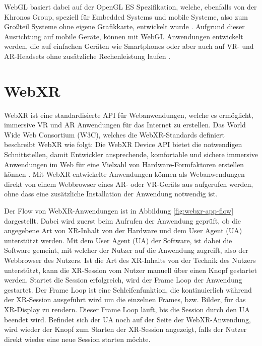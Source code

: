 WebGL basiert dabei auf der OpenGL ES Spezifikation, welche, ebenfalls von der Khronos Group, speziell für Embedded Systems und mobile Systeme, also zum Großteil Systeme ohne eigene Grafikkarte, entwickelt wurde \autocite[]{khronos-opengles}.
Aufgrund dieser Ausrichtung auf mobile Geräte, können mit WebGL Anwendungen entwickelt werden, die auf einfachen Geräten wie Smartphones oder aber auch auf VR- und AR-Headsets ohne zusätzliche Rechenleistung laufen \autocite[][S.3]{Baruah2021}.


\section{WebXR}
\label{section:webxr}

WebXR ist eine standardisierte API für Webanwendungen, welche es ermöglicht, immersive VR und AR Anwendungen für das Internet zu erstellen.
Das World Wide Web Consortium (W3C), welches die WebXR-Standards definiert beschreibt WebXR wie folgt: \glqq{}Die WebXR Device API bietet die notwendigen Schnittstellen, damit Entwickler ansprechende, komfortable und sichere immersive Anwendungen im Web für eine Vielzahl von Hardware-Formfaktoren erstellen können\grqq{} \autocite[aus dem Englischen mit DeepL ][1. Introduction]{w3c_webxr}.
Mit WebXR entwickelte Anwendungen können als Webanwendungen direkt von einem Webbrowser eines AR- oder VR-Geräts aus aufgerufen werden, ohne dass eine zusätzliche Installation der Anwendung notwendig ist.

Der Flow von WebXR-Anwendungen ist in Abbildung \ref{fig:webxr-app-flow} dargestellt.
Dabei wird zuerst beim Aufrufen der Anwendung geprüft, ob die angegebene Art von XR-Inhalt von der Hardware und dem User Agent (UA) unterstützt werden.
Mit dem User Agent (UA) der Software, ist dabei die Software gemeint, mit welcher der Nutzer auf die Anwendung zugreift, also der Webbrowser des Nutzers.
Ist die Art des XR-Inhalts von der Technik des Nutzers unterstützt, kann die XR-Session vom Nutzer manuell über einen Knopf gestartet werden.
Startet die Session erfolgreich, wird der Frame Loop der Anwendung gestartet.
Der Frame Loop ist eine Schleifenfunktion, die kontinuierlich während der XR-Session ausgeführt wird um die einzelnen Frames, bzw. Bilder, für das XR-Display zu rendern.
Dieser Frame Loop läuft, bis die Session durch den UA beendet wird.
Befindet sich der UA noch auf der Seite der WebXR-Anwendung, wird wieder der Knopf zum Starten der XR-Session angezeigt, falls der Nutzer direkt wieder eine neue Session starten möchte.

